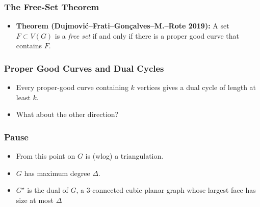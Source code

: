 \documentclass[xcolor=dvipsnames]{beamer}
\newcommand{\dual}[1]{#1^\star}
\begin{document}
\begin{frame}
   \frametitle{The Free-Set Theorem}
   
   \begin{itemize}
       \item[]\textbf{Theorem (Dujmovi\'c--Frati--Gon\c{c}alves--M.--Rote 2019):} A set $F\subset V(G)$ is a \emph{free set} if and only if there is a proper good curve that contains $F$.
   \end{itemize}
\end{frame}

\begin{frame}
  \frametitle{Proper Good Curves and Dual Cycles} 

  \begin{itemize}[<+->]
     \item Every proper-good curve containing $k$ vertices gives a dual
       cycle of length at least $k$.
     \item What about the other direction?
  \end{itemize}
\end{frame}

\begin{frame}
   \frametitle{Pause}

   \begin{itemize}
      \item From this point on $G$ is (wlog) a triangulation.
      \item $G$ has maximum degree $\Delta$.
      \item $\dual{G}$ is the dual of $G$, a 3-connected cubic planar
      graph whose largest face has size at most $\Delta$
   \end{itemize}
\end{frame}
\end{document}
